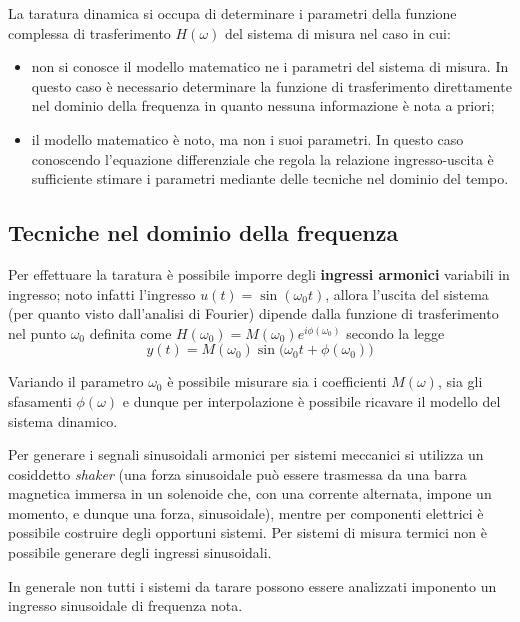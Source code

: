 	La taratura dinamica si occupa di determinare i parametri della funzione complessa di trasferimento $H(\omega)$ del sistema di misura nel caso in cui:
	\begin{itemize}
		\item non si conosce il modello matematico ne i parametri del sistema di misura. In questo caso è necessario determinare la funzione di trasferimento direttamente nel dominio della frequenza in quanto nessuna informazione è nota a priori;
		\item il modello matematico è noto, ma non i suoi parametri. In questo caso conoscendo l'equazione differenziale che regola la relazione ingresso-uscita è sufficiente stimare i parametri mediante delle tecniche nel dominio del tempo.
	\end{itemize}
	
	\subsection{Tecniche nel dominio della frequenza}

	Per effettuare la taratura è possibile imporre degli \textbf{ingressi armonici} variabili in ingresso; noto infatti l'ingresso $u(t) = \sin(\omega_0 t)$, allora l'uscita del sistema (per quanto visto dall'analisi di Fourier) dipende dalla funzione di trasferimento nel punto $\omega_0$ definita come $H(\omega_0) = M(\omega_0) e^{i\phi(\omega_0)}$ secondo la legge
	\[ y(t) = M(\omega_0 ) \sin \big(\omega_0 t+ \phi(\omega_0) \big)\]
	
	Variando il parametro $\omega_0$ è possibile misurare sia i coefficienti $M(\omega)$, sia gli sfasamenti $\phi(\omega)$ e dunque per interpolazione è possibile ricavare il modello del sistema dinamico.
	
	Per generare i segnali sinusoidali armonici per sistemi meccanici si utilizza un cosiddetto \textit{shaker} (una forza sinusoidale può essere trasmessa da una barra magnetica immersa in un solenoide che, con una corrente alternata, impone un momento, e dunque una forza, sinusoidale), mentre per componenti elettrici è possibile costruire degli opportuni sistemi. Per sistemi di misura termici  non è possibile generare degli ingressi sinusoidali.
	
	\begin{nota}
		In generale non tutti i sistemi da tarare possono essere analizzati imponento un ingresso sinusoidale di frequenza nota.	
	\end{nota}
	
